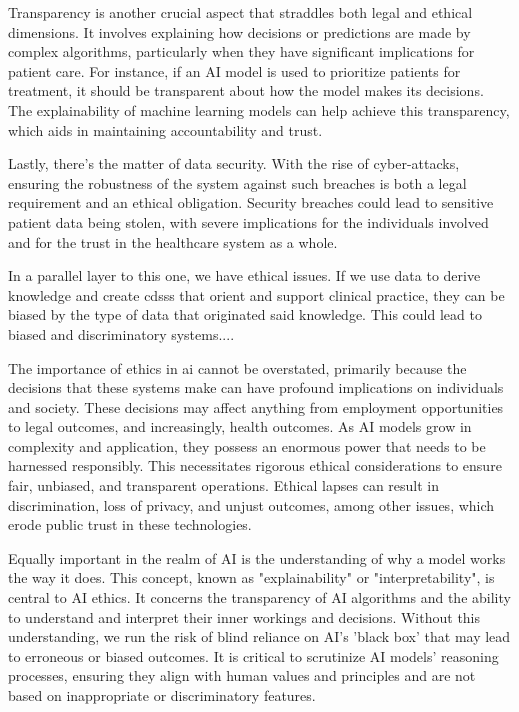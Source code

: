 Transparency is another crucial aspect that straddles both legal and ethical dimensions. It involves explaining how decisions or predictions are made by complex algorithms, particularly when they have significant implications for patient care. For instance, if an AI model is used to prioritize patients for treatment, it should be transparent about how the model makes its decisions. The explainability of machine learning models can help achieve this transparency, which aids in maintaining accountability and trust.

Lastly, there's the matter of data security. With the rise of cyber-attacks, ensuring the robustness of the system against such breaches is both a legal requirement and an ethical obligation. Security breaches could lead to sensitive patient data being stolen, with severe implications for the individuals involved and for the trust in the healthcare system as a whole.


In a parallel layer to this one, we have ethical issues. If we use data to derive knowledge and create  \acp{cdss} that orient and support clinical practice, they can be biased by the type of data that originated said knowledge.
This could lead to biased and discriminatory systems....

The importance of ethics in \ac{ai} cannot be overstated, primarily because the decisions that these systems make can have profound implications on individuals and society. These decisions may affect anything from employment opportunities to legal outcomes, and increasingly, health outcomes. As AI models grow in complexity and application, they possess an enormous power that needs to be harnessed responsibly. This necessitates rigorous ethical considerations to ensure fair, unbiased, and transparent operations. Ethical lapses can result in discrimination, loss of privacy, and unjust outcomes, among other issues, which erode public trust in these technologies.

Equally important in the realm of AI is the understanding of why a model works the way it does. This concept, known as "explainability" or "interpretability", is central to AI ethics. It concerns the transparency of AI algorithms and the ability to understand and interpret their inner workings and decisions. Without this understanding, we run the risk of blind reliance on AI's 'black box' that may lead to erroneous or biased outcomes. It is critical to scrutinize AI models' reasoning processes, ensuring they align with human values and principles and are not based on inappropriate or discriminatory features.


